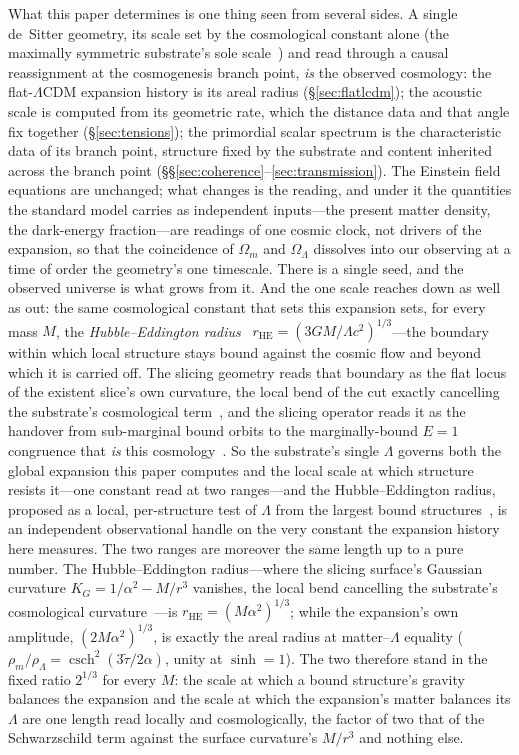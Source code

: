 \documentclass[11pt,a4paper]{article}
\theoremstyle{plain}
\theoremstyle{definition}
\theoremstyle{remark}
\begin{document}
What this paper determines is one thing seen from several sides. A single de~Sitter geometry, its scale set by the cosmological constant alone (the maximally symmetric substrate's sole scale~\cite{JanzenGeometricCore}) and read through a causal reassignment at the cosmogenesis branch point, \emph{is} the observed cosmology: the flat-$\Lambda$CDM expansion history is its areal radius (\S\ref{sec:flatlcdm}); the acoustic scale is computed from its geometric rate, which the distance data and that angle fix together (\S\ref{sec:tensions}); the primordial scalar spectrum is the characteristic data of its branch point, structure fixed by the substrate and content inherited across the branch point (\S\S\ref{sec:coherence}--\ref{sec:transmission}). The Einstein field equations are unchanged; what changes is the reading, and under it the quantities the standard model carries as independent inputs---the present matter density, the dark-energy fraction---are readings of one cosmic clock, not drivers of the expansion, so that the coincidence of $\Omega_{m}$ and $\Omega_\Lambda$ dissolves into our observing at a time of order the geometry's one timescale. There is a single seed, and the observed universe is what grows from it. And the one scale reaches down as well as out: the same cosmological constant that sets this expansion sets, for every mass $M$, the \emph{Hubble--Eddington radius}~\cite{Eddington1933} $r_{\mathrm{HE}}=(3GM/\Lambda c^{2})^{1/3}$---the boundary within which local structure stays bound against the cosmic flow and beyond which it is carried off. The slicing geometry reads that boundary as the flat locus of the existent slice's own curvature, the local bend of the cut exactly cancelling the substrate's cosmological term~\cite{JanzenSlicing}, and the slicing operator reads it as the handover from sub-marginal bound orbits to the marginally-bound $E=1$ congruence that \emph{is} this cosmology~\cite{JanzenOperator}. So the substrate's single $\Lambda$ governs both the global expansion this paper computes and the local scale at which structure resists it---one constant read at two ranges---and the Hubble--Eddington radius, proposed as a local, per-structure test of $\Lambda$ from the largest bound structures~\cite{PavlidouTomaras2014}, is an independent observational handle on the very constant the expansion history here measures. The two ranges are moreover the same length up to a pure number. The Hubble--Eddington radius---where the
slicing surface's Gaussian curvature $K_{G}=1/\alpha^{2}-M/r^{3}$ vanishes, the local bend cancelling the
substrate's cosmological curvature~\cite{JanzenSlicing}---is $r_{\mathrm{HE}}=(M\alpha^{2})^{1/3}$; while the
expansion's own amplitude, $(2M\alpha^{2})^{1/3}$, is exactly the areal radius at matter--$\Lambda$ equality
($\rho_m/\rho_\Lambda=\operatorname{csch}^{2}(3\tilde\tau/2\alpha)$, unity at $\sinh=1$). The two therefore
stand in the fixed ratio $2^{1/3}$ for every $M$: the scale at which a bound structure's gravity balances the
expansion and the scale at which the expansion's matter balances its $\Lambda$ are one length read locally and
cosmologically, the factor of two that of the Schwarzschild term against the surface curvature's $M/r^{3}$ and
nothing else. 
\end{document}
